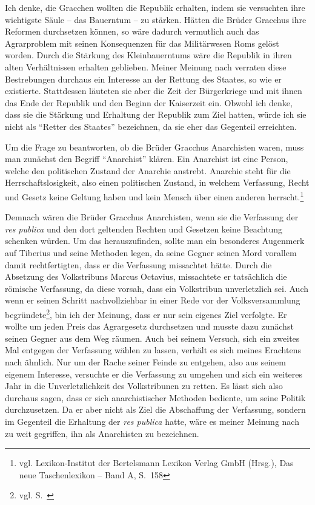\documentclass[
    12pt,
    smallheadings,
    ]{scrreprt}
\begin{document}
Ich denke, die Gracchen wollten die Republik erhalten, indem sie versuchten ihre wichtigste Säule -- das Bauerntum -- zu stärken.
Hätten die Brüder Gracchus ihre Reformen durchsetzen können, so wäre dadurch vermutlich auch das Agrarproblem mit seinen Konsequenzen für das Militärwesen Roms gelöst worden.
Durch die Stärkung des Kleinbauerntums wäre die Republik in ihren alten Verhältnissen erhalten geblieben.
Meiner Meinung nach verraten diese Bestrebungen durchaus ein Interesse an der Rettung des Staates, so wie er existierte.
Stattdessen läuteten sie aber die Zeit der Bürgerkriege und mit ihnen das Ende der Republik und den Beginn der Kaiserzeit ein.
Obwohl ich denke, dass sie die Stärkung und Erhaltung der Republik zum Ziel hatten, würde ich sie nicht als "`Retter des Staates"' bezeichnen, da sie eher das Gegenteil erreichten.



Um die Frage zu beantworten, ob die Brüder Gracchus Anarchisten waren, muss man zunächst den Begriff "`Anarchist"' klären.
Ein Anarchist ist eine Person, welche den politischen Zustand der Anarchie anstrebt.
Anarchie steht für die Herrschaftslosigkeit, also einen politischen Zustand, in welchem Verfassung, Recht und Gesetz keine Geltung haben und kein Mensch über einen anderen herrscht.\footnote{vgl. Lexikon-Institut der Bertelsmann Lexikon Verlag GmbH (Hrsg.), Das neue Taschenlexikon -- Band A, S.~158}

Demnach wären die Brüder Gracchus Anarchisten, wenn sie die Verfassung der \textit{res publica} und den dort geltenden Rechten und Gesetzen keine Beachtung schenken würden.
Um das herauszufinden, sollte man ein besonderes Augenmerk auf Tiberius und seine Methoden legen, da seine Gegner seinen Mord vorallem damit rechtfertigten, dass er die Verfassung missachtet hätte.
Durch die Absetzung des Volkstribuns Marcus Octavius, missachtete er tatsächlich die römische Verfassung, da diese vorsah, dass ein Volkstribun unverletzlich sei.
Auch wenn er seinen Schritt nachvollziehbar in einer Rede vor der Volksversammlung begründete\footnote{vgl. S.~\pageref{octavius}}, bin ich der Meinung, dass er nur sein eigenes Ziel verfolgte.
Er wollte um jeden Preis das Agrargesetz durchsetzen und musste dazu zunächst seinen Gegner aus dem Weg räumen.
Auch bei seinem Versuch, sich ein zweites Mal entgegen der Verfassung wählen zu lassen, verhält es sich meines Erachtens nach ähnlich.
Nur um der Rache seiner Feinde zu entgehen, also aus seinem eigenem Interesse, versuchte er die Verfassung zu umgehen und sich ein weiteres Jahr in die Unverletzlichkeit des Volkstribunen zu retten.
Es lässt sich also durchaus sagen, dass er sich anarchistischer Methoden bediente, um seine Politik durchzusetzen.
Da er aber nicht als Ziel die Abschaffung der Verfassung, sondern im Gegenteil die Erhaltung der \textit{res publica} hatte, wäre es meiner Meinung nach zu weit gegriffen, ihn als Anarchisten zu bezeichnen.
\end{document}
